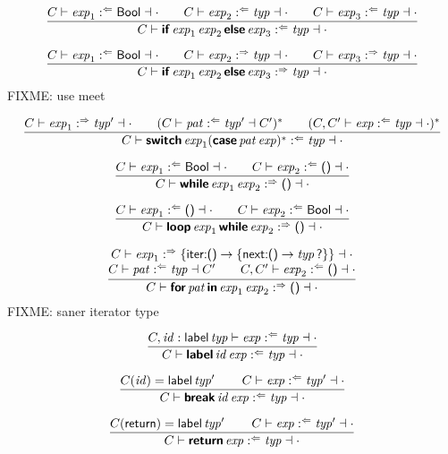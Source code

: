 $$
\frac{
  C \vdash \x{exp}_1 \anal \K{Bool} \dashv \cdot
  \qquad
  C \vdash \x{exp}_2 \anal \x{typ} \dashv \cdot
  \qquad
  C \vdash \x{exp}_3 \anal \x{typ} \dashv \cdot
}{
  C \vdash \KK{if} \x{exp}_1 \x{exp}_2 \KK{else} \x{exp}_3 \anal \x{typ} \dashv \cdot
}
$$

$$
\frac{
  C \vdash \x{exp}_1 \anal \K{Bool} \dashv \cdot
  \qquad
  C \vdash \x{exp}_2 \synth \x{typ} \dashv \cdot
  \qquad
  C \vdash \x{exp}_3 \synth \x{typ} \dashv \cdot
}{
  C \vdash \KK{if} \x{exp}_1 \x{exp}_2 \KK{else} \x{exp}_3 \synth \x{typ} \dashv \cdot
}
$$
FIXME: use meet

$$
\frac{
  C \vdash \x{exp}_1 \synth \x{typ}' \dashv \cdot
  \qquad
  (C \vdash \x{pat} \anal \x{typ}' \dashv C')^\ast
  \qquad
  (C, C' \vdash \x{exp} \anal \x{typ} \dashv \cdot)^\ast
}{
  C \vdash \KK{switch} \x{exp}_1 (\KK{case} \x{pat} \x{exp})^\ast \anal \x{typ} \dashv \cdot
}
$$

$$
\frac{
  C \vdash \x{exp}_1 \anal \K{Bool} \dashv \cdot
  \qquad
  C \vdash \x{exp}_2 \anal \K{()} \dashv \cdot
}{
  C \vdash \KK{while} \x{exp}_1 \x{exp}_2 \synth \K{()} \dashv \cdot
}
$$

$$
\frac{
  C \vdash \x{exp}_1 \anal \K{()} \dashv \cdot
  \qquad
  C \vdash \x{exp}_2 \anal \K{Bool} \dashv \cdot
}{
  C \vdash \KK{loop} \x{exp}_1 \KK{while} \x{exp}_2 \synth \K{()} \dashv \cdot
}
$$

$$
\frac{
  \begin{array}{@{}c@{}}
  C \vdash \x{exp}_1 \synth \{{\K{iter}} \K: \K{()} \Kto \K\{\K{next} \K: \K{()} \Kto \x{typ} \K?\}\} \dashv \cdot
  \\
  C \vdash \x{pat} \anal \x{typ} \dashv C'
  \qquad
  C, C' \vdash \x{exp}_2 \anal \K{()} \dashv \cdot
  \end{array}
}{
  C \vdash \KK{for} \x{pat} \KK{in} \x{exp}_1 \x{exp}_2 \synth \K{()} \dashv \cdot
}
$$
FIXME: saner iterator type

$$
\frac{
  C, \x{id} : \K{label} \x{typ} \vdash \x{exp} \anal \x{typ} \dashv \cdot
}{
  C \vdash \KK{label} \x{id} \x{exp} \anal \x{typ} \dashv \cdot
}
$$

$$
\frac{
  C(\x{id}) = \K{label} \x{typ}'
  \qquad
  C \vdash \x{exp} \anal \x{typ}' \dashv \cdot
}{
  C \vdash \KK{break} \x{id} \x{exp} \anal \x{typ} \dashv \cdot
}
$$

$$
\frac{
  C(\K{return}) = \K{label} \x{typ}'
  \qquad
  C \vdash \x{exp} \anal \x{typ}' \dashv \cdot
}{
  C \vdash \KK{return} \x{exp} \anal \x{typ} \dashv \cdot
}
$$

